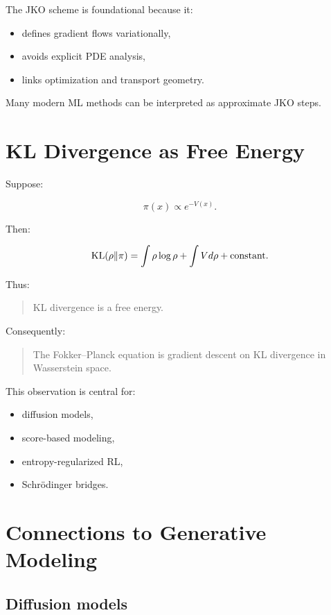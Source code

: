 The JKO scheme is foundational because it:

\begin{itemize}
    \item defines gradient flows variationally,
    \item avoids explicit PDE analysis,
    \item links optimization and transport geometry.
\end{itemize}

Many modern ML methods can be interpreted as approximate JKO steps.

\section{KL Divergence as Free Energy}

Suppose:

\[
\pi(x)
\propto
e^{-V(x)}.
\]

Then:

\[
\mathrm{KL}(\rho\|\pi)
=
\int \rho\log \rho
+
\int Vd\rho
+
\text{constant}.
\]

Thus:

\begin{quote}
KL divergence is a free energy.
\end{quote}

Consequently:

\begin{quote}
The Fokker--Planck equation is gradient descent on KL divergence in Wasserstein space.
\end{quote}

This observation is central for:

\begin{itemize}
    \item diffusion models,
    \item score-based modeling,
    \item entropy-regularized RL,
    \item Schr\"odinger bridges.
\end{itemize}

\section{Connections to Generative Modeling}

\subsection{Diffusion models}

